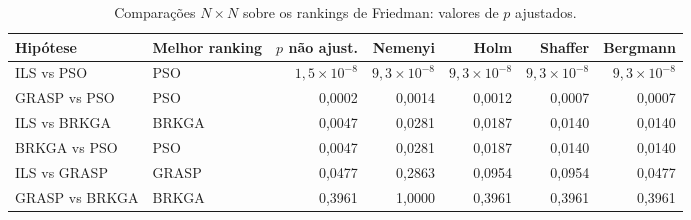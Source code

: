 \begin{table}[t]
\centering
\caption{Comparações $N\times N$ sobre os rankings de Friedman: valores de $p$ ajustados.}
\label{tab:posthocnxn}
\footnotesize
\begin{tabular}{@{}llrrrrr@{}}
\toprule
Hipótese & Melhor ranking & $p$ não ajust. & Nemenyi & Holm & Shaffer & Bergmann \\
\midrule
ILS vs PSO & PSO & $1,5\times10^{-8}$ & $9,3\times10^{-8}$ & $9,3\times10^{-8}$ & $9,3\times10^{-8}$ & $9,3\times10^{-8}$ \\
GRASP vs PSO & PSO & 0,0002 & 0,0014 & 0,0012 & 0,0007 & 0,0007 \\
ILS vs BRKGA & BRKGA & 0,0047 & 0,0281 & 0,0187 & 0,0140 & 0,0140 \\
BRKGA vs PSO & PSO & 0,0047 & 0,0281 & 0,0187 & 0,0140 & 0,0140 \\
ILS vs GRASP & GRASP & 0,0477 & 0,2863 & 0,0954 & 0,0954 & 0,0477 \\
GRASP vs BRKGA & BRKGA & 0,3961 & 1,0000 & 0,3961 & 0,3961 & 0,3961 \\
\bottomrule
\end{tabular}
\end{table}
